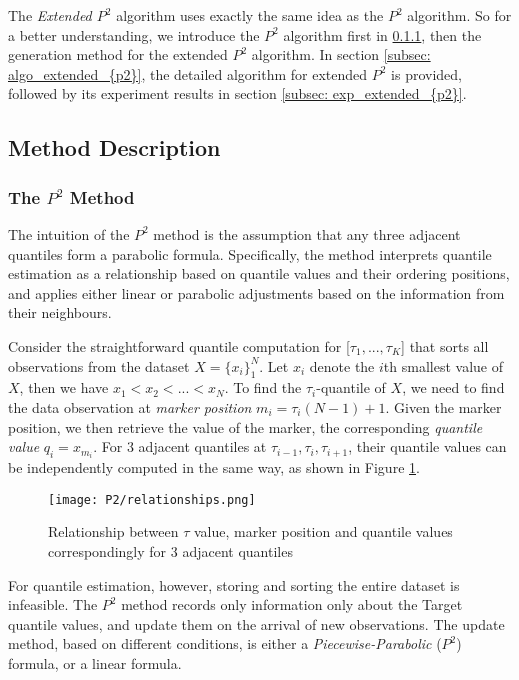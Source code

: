 The \textit{Extended $P^2$} algorithm\cite{raatikainenSequentialProcedureSimultaneous1993} uses exactly the same idea as the $P^2$ algorithm\cite{jainP2AlgorithmDynamic1985}. So for a better understanding, we introduce the $P^2$ algorithm first in \ref{subsubsec: description_{p2}}, then the generation method for the extended $P^2$ algorithm.
In section \ref{subsec: algo_extended_{p2}}, the detailed algorithm for extended $P^2$ is provided, followed by its experiment results in section \ref{subsec: exp_extended_{p2}}.

\subsection{Method Description}
\subsubsection{The $P^2$ Method}
\label{subsubsec: description_{p2}}

The intuition of the $P^2$ method is the assumption that any three adjacent quantiles form a parabolic formula.
Specifically, the method interprets quantile estimation as a relationship based on quantile values and their ordering positions, and applies either linear or parabolic adjustments based on the information from their neighbours.

Consider the straightforward quantile computation for [$\tau_1, ..., \tau_K$] that sorts all observations from the dataset $X = \{x_i\}^N_1$. Let $x_i$ denote the $i$th smallest value of $X$, then we have $x_1 < x_2 < ... < x_N$. 
To find the $\tau_i$-quantile of $X$, we need to find the data observation at \textit{marker position} $m_i = \tau_i (N-1) + 1$. Given the marker position, we then retrieve the value of the marker, the corresponding \textit{quantile value} $q_i = x_{m_i}$. 
For 3 adjacent quantiles at $\tau_{i-1}, \tau_i, \tau_{i+1}$, their quantile values can be independently computed in the same way, as shown in Figure \ref{fig: {multi_relationship_p2}}.

\begin{figure}[h]
    \centering
	\texttt{[image: P2/relationships.png]}
    \caption{Relationship between $\tau$ value, marker position and quantile values correspondingly for 3 adjacent quantiles}
    \label{fig: {multi_relationship_p2}}
\end{figure}

For quantile estimation, however, storing and sorting the entire dataset is infeasible. The $P^2$ method records only information only about the Target quantile values, and update them on the arrival of new observations. The update method, based on different conditions, is either a \textit{Piecewise-Parabolic} ($P^2$) formula, or a linear formula.


